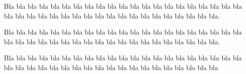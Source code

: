 \documentclass{article}
\begin{document}
Bla bla bla bla bla bla bla bla bla bla bla bla bla bla bla bla bla bla bla bla
bla bla bla bla bla bla bla bla bla bla bla bla bla bla bla bla bla bla bla bla.

\begin{center}
\end{center}

Bla bla bla bla bla bla bla bla bla bla bla bla bla bla bla bla bla bla bla bla bla bla bla bla bla bla bla bla bla bla bla bla bla bla bla bla bla bla bla bla.

\begin{center}
\end{center}

Bla bla bla bla bla bla bla bla bla bla bla bla bla bla bla bla bla bla bla bla
bla bla bla bla bla bla bla bla bla bla bla bla bla bla bla bla bla bla bla bla


\end{document}
